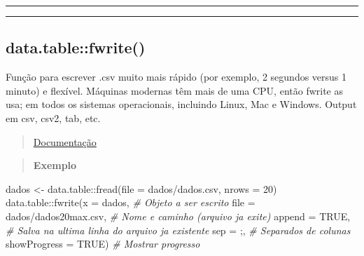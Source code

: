 \documentclass[
]{book}
\newenvironment{Shaded}{\begin{snugshade}}{\end{snugshade}}
\newcommand{\AttributeTok}[1]{\textcolor[rgb]{0.77,0.63,0.00}{#1}}
\newcommand{\CommentTok}[1]{\textcolor[rgb]{0.56,0.35,0.01}{\textit{#1}}}
\newcommand{\ConstantTok}[1]{\textcolor[rgb]{0.00,0.00,0.00}{#1}}
\newcommand{\DecValTok}[1]{\textcolor[rgb]{0.00,0.00,0.81}{#1}}
\newcommand{\FunctionTok}[1]{\textcolor[rgb]{0.00,0.00,0.00}{#1}}
\newcommand{\NormalTok}[1]{#1}
\newcommand{\OtherTok}[1]{\textcolor[rgb]{0.56,0.35,0.01}{#1}}
\newcommand{\SpecialCharTok}[1]{\textcolor[rgb]{0.00,0.00,0.00}{#1}}
\newcommand{\StringTok}[1]{\textcolor[rgb]{0.31,0.60,0.02}{#1}}
\theoremstyle{definition}
\theoremstyle{definition}
\theoremstyle{definition}
\theoremstyle{definition}
\theoremstyle{remark}
\begin{document}
\begin{center}\rule{0.5\linewidth}{0.5pt}\end{center}

\begin{center}\rule{0.5\linewidth}{0.5pt}\end{center}

\hypertarget{data.tablefwrite}{%
\subsection{data.table::fwrite()}\label{data.tablefwrite}}

Função para escrever .csv muito mais rápido (por exemplo, 2 segundos versus 1 minuto) e flexível. Máquinas modernas têm mais de uma CPU, então fwrite as usa; em todos os sistemas operacionais, incluindo Linux, Mac e Windows. Output em csv, csv2, tab, etc.

\begin{quote}
\href{https://www.rdocumentation.org/packages/data.table/versions/1.14.2/topics/fwrite}{Documentação}
\end{quote}

\begin{quote}
\textbf{Exemplo}
\end{quote}

\begin{Shaded}
\begin{Highlighting}[]
\NormalTok{dados }\OtherTok{\textless{}{-}}\NormalTok{ data.table}\SpecialCharTok{::}\FunctionTok{fread}\NormalTok{(}\AttributeTok{file =} \StringTok{\textquotesingle{}dados/dados.csv\textquotesingle{}}\NormalTok{, }\AttributeTok{nrows =} \DecValTok{20}\NormalTok{)}
\NormalTok{data.table}\SpecialCharTok{::}\FunctionTok{fwrite}\NormalTok{(}\AttributeTok{x =}\NormalTok{ dados,                     }\CommentTok{\# Objeto a ser escrito}
                   \AttributeTok{file =} \StringTok{\textquotesingle{}dados/dados20max.csv\textquotesingle{}}\NormalTok{, }\CommentTok{\# Nome e caminho (arquivo ja exite)}
                   \AttributeTok{append =} \ConstantTok{TRUE}\NormalTok{,                 }\CommentTok{\# Salva na ultima linha do arquivo ja existente}
                   \AttributeTok{sep =} \StringTok{\textquotesingle{};\textquotesingle{}}\NormalTok{,                     }\CommentTok{\# Separados de colunas}
                   \AttributeTok{showProgress =} \ConstantTok{TRUE}\NormalTok{)           }\CommentTok{\# Mostrar progresso}
\end{Highlighting}
\end{Shaded}
\end{document}
